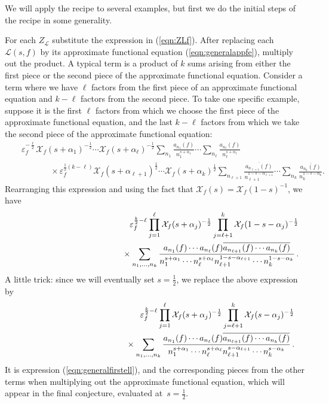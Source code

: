\documentclass[12pt,letterpaper]{amsart}
\theoremstyle{plain}
\theoremstyle{definition}
\theoremstyle{remark}
\numberwithin{equation}{subsection}
\numberwithin{theorem}{subsection}
\numberwithin{table}{subsection}
\begin{document}
We will apply the recipe to several examples, but first we
do the initial steps of the recipe in some generality.

For each
$Z_\mathcal{L}$ substitute the expression in (\ref{eqn:ZLf}). 
After replacing
each $\mathcal{L}(s,f)$ by its approximate functional equation 
(\ref{eqn:generalappfe}),
multiply out the product. A typical term is
a product of $k$ sums arising from either the first piece or the
second piece of the approximate functional equation. Consider a
term where we have $\ell$ factors from the first piece of an
approximate functional equation and $k-\ell$ factors from the
second piece.  To take one specific example, suppose it is the
first $\ell$ factors from which we choose the first piece of the
approximate functional equation, and the last $k-\ell$ factors
from which we take the second piece of the approximate functional
equation: 
\begin{eqnarray}
&   & \varepsilon_f^{-\frac \ell 2} \mathcal{X}_f(s +\alpha_1)^{-\frac 12}\cdots 
\mathcal{X}_f(s +\alpha_\ell)^{-\frac 12}
\sum_{n_1}\frac {a_{n_1}(f)}{n_1^{s +\alpha_1}}\cdots 
\sum_{n_\ell}\frac {a_{n_\ell}(f)}{n_\ell^{s +\alpha_\ell}}\nonumber \\
&   &\phantom{xxxxxx} \times \varepsilon_f^{\frac12(k-\ell)} 
\mathcal{X}_f(s +\alpha_{\ell+1})^{\frac12} 
\cdots 
\mathcal{X}_f(s +\alpha_{k})^{\frac12}
\sum_{n_{\ell+1}}\frac
{\overline{a_{n_{\ell+1}}(f)}}{n_{\ell+1}^{1-s -\alpha_{\ell+1}}} 
\cdots \sum_{n_{k}}\frac
{\overline{a_{n_{k}}(f)}}{n_{k}^{1-s -\alpha_{k}}} .
\end{eqnarray}
Rearranging this expression and using the fact that
$\mathcal{X}_f(s)=\mathcal{X}_f(1-s)^{-1}$, we have
\begin{eqnarray}
&   & 
\varepsilon_f^{\frac{k}{2}-\ell}
\prod_{j=1}^\ell \mathcal{X}_f(s +\alpha_j)^{-\frac12}
\prod_{j=\ell+1}^k \mathcal{X}_f(1-s -\alpha_j)^{-\frac12}
\cr
&   & \phantom{XXXXXXXXXXXxxxx} \times
\sum_{n_1,\dots, n_k}
    \frac{
a_{n_1}(f)\cdots a_{n_\ell}(f)
\overline{a_{n_{\ell+1}}(f)\cdots a_{n_k}(f)}
}{n_1^{s +\alpha_1}\cdots n_\ell^{s +\alpha_\ell}
n_{\ell+1}^{1-s -\alpha_{\ell+1}} \cdots n_k^{1-s-\alpha_k}}
\, 
.
 \end{eqnarray}
A little trick:  since we will eventually set $s=\frac12$, we 
replace the above expression by
\begin{eqnarray}\label{eqn:generalfirstell}
&   & 
\varepsilon_f^{\frac{k}{2}-\ell}
\prod_{j=1}^\ell \mathcal{X}_f(s +\alpha_j)^{-\frac12}
\prod_{j=\ell+1}^k \mathcal{X}_f(s -\alpha_j)^{-\frac12}
\cr
&   & \phantom{XXXXXXXXXXXxxxx} \times
\sum_{n_1,\dots, n_k}
    \frac{
a_{n_1}(f)\cdots a_{n_\ell}(f)
\overline{a_{n_{\ell+1}}(f)\cdots a_{n_k}(f)}
}{n_1^{s +\alpha_1}\cdots n_\ell^{s +\alpha_\ell}
n_{\ell+1}^{s -\alpha_{\ell+1}} \cdots n_k^{s-\alpha_k}}
\, 
.
 \end{eqnarray}
It is expression (\ref{eqn:generalfirstell}), and the corresponding
pieces from the other terms when multiplying out the approximate functional
equation, which will appear in the final conjecture, evaluated
at~$s=\frac12$.
\end{document}
